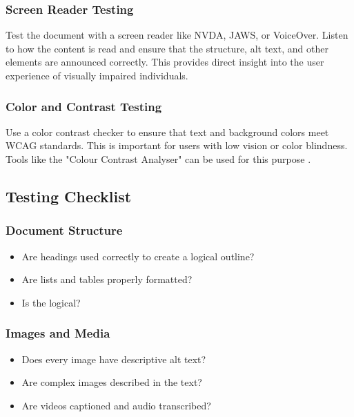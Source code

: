 \subsubsection{Screen Reader Testing}\label{ch15:ssec:sr-testing}
Test the document with a screen reader like NVDA, JAWS, or VoiceOver. Listen to how the content is read and ensure that the structure, alt text, and other elements are announced correctly. This provides direct insight into the user experience of visually impaired individuals.

\subsubsection{Color and Contrast Testing}\label{ch15:sssec:color-contrast-testing}
Use a color contrast checker to ensure that text and background colors meet WCAG standards. This is important for users with low vision or color blindness. Tools like the "Colour Contrast Analyser" can be used for this purpose \supercite{TGPiCCA}.

\subsection{Testing Checklist}\label{ch15:ssec:testing-checklist}

\subsubsection{Document Structure}\label{ch15:sssec:checklist-structure}
\begin{itemize}
	\item Are headings used correctly to create a logical outline?
	\item Are lists and tables properly formatted?
	\item Is the  logical?
\end{itemize}

\subsubsection{Images and Media}\label{ch15:sssec:checklist-images}
\begin{itemize}
	\item Does every image have descriptive alt text?
	\item Are complex images described in the text?
	\item Are videos captioned and audio transcribed?
\end{itemize}

